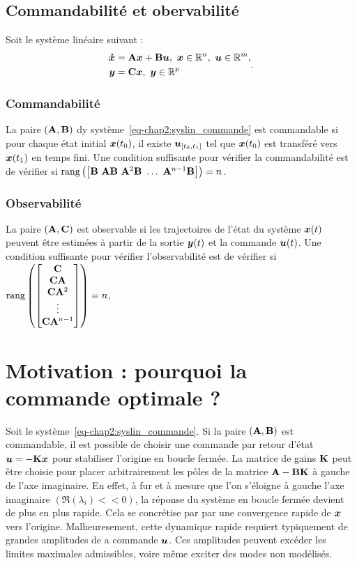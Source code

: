 \subsection{Commandabilité et obervabilité}
Soit le système linéaire suivant : 
\begin{align}\label{eq-chap2:syslin_commande}
	\begin{split}
		\stateDot &= \matriceA\state+\matriceB\command, \ \state\inR^n, \ \command\inR^m,\\
		\out &= \matriceC\state, \ \out\inR^p
	\end{split}.
\end{align}
\subsubsection{Commandabilité} La paire $\left(\mathbf{A},\mathbf{B}\right)$ dy système~\eqref{eq-chap2:syslin_commande} est commandable si pour chaque état initial $\bm{x}(t_0)$, il existe $\bm{u}_{\left[t_0,t_1\right]}$ tel que $\bm{x}(t_0)$ est transféré vers $\bm{x}(t_1)$ en temps fini. 
Une condition suffisante pour vérifier la commandabilité est de vérifier si ${\rm{rang}}\left(\left[\matriceB \ \matriceA\matriceB \ \matriceA^2\matriceB \ \ldots \ \matriceA^{n-1}\matriceB\right]\right)=n$.

\subsubsection{Observabilité} La paire $\left(\mathbf{A},\mathbf{C}\right)$ est observable si les trajectoires de l'état du système $\bm{x}(t)$ peuvent être estimées à partir de la sortie $\bm{y}(t)$ et la commande $\bm{u}(t)$. Une condition suffisante pour vérifier l'observabilité est de vérifier si ${\rm{rang}}\left(\begin{bmatrix}
	\mathbf{C} \\ \mathbf{C}\mathbf{A} \\ \mathbf{C}\mathbf{A}^2 \\ \vdots\\ \mathbf{C}\mathbf{A}^{n-1}
\end{bmatrix} \right)=n$.
\section{Motivation : pourquoi la commande optimale ?}

Soit le système~\eqref{eq-chap2:syslin_commande}. Si la paire $(\mathbf{A},\mathbf{B})$ est commandable, il est possible de choisir une commande par retour d'état $\bm{u} = -\mathbf{K}\bm{x}$ pour stabiliser l'origine en boucle fermée. La matrice de gains $\mathbf{K}$ peut être choisie pour placer arbitrairement les pôles de la matrice $\mathbf{A} -\mathbf{B}\mathbf{K}$ à gauche de l'axe imaginaire. En effet, à fur et à mesure que l'on s'éloigne à gauche l'axe imaginaire $(\Re(\lambda_i)<<0)$, la réponse du système en boucle fermée devient de plus en plus rapide. Cela se concrétise par par une convergence rapide de $\bm{x}$ vers l'origine. Malheuresement, cette dynamique rapide requiert typiquement de grandes amplitudes de a commande $\bm{u}$. Ces amplitudes peuvent  excéder les limites maximales admissibles, voire même exciter des modes non modélisés. 

